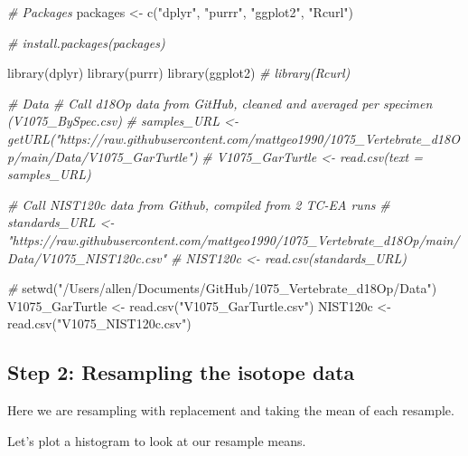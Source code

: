 \documentclass[
]{article}
\newenvironment{Shaded}{\begin{snugshade}}{\end{snugshade}}
\newcommand{\CommentTok}[1]{\textcolor[rgb]{0.56,0.35,0.01}{\textit{#1}}}
\newcommand{\FunctionTok}[1]{\textcolor[rgb]{0.00,0.00,0.00}{#1}}
\newcommand{\NormalTok}[1]{#1}
\newcommand{\OtherTok}[1]{\textcolor[rgb]{0.56,0.35,0.01}{#1}}
\newcommand{\StringTok}[1]{\textcolor[rgb]{0.31,0.60,0.02}{#1}}
\begin{document}
\begin{Shaded}
\begin{Highlighting}[]
\CommentTok{\# Packages}
\NormalTok{packages }\OtherTok{\textless{}{-}} \FunctionTok{c}\NormalTok{(}\StringTok{"dplyr"}\NormalTok{, }\StringTok{"purrr"}\NormalTok{, }\StringTok{"ggplot2"}\NormalTok{, }\StringTok{"Rcurl"}\NormalTok{)}

\CommentTok{\# install.packages(packages)}

\FunctionTok{library}\NormalTok{(dplyr)}
\FunctionTok{library}\NormalTok{(purrr)}
\FunctionTok{library}\NormalTok{(ggplot2)}
\CommentTok{\# library(Rcurl)}

\CommentTok{\# Data}
    \CommentTok{\# Call d18Op data from GitHub, cleaned and averaged per specimen (V1075\_BySpec.csv)}
      \CommentTok{\# samples\_URL \textless{}{-} getURL("https://raw.githubusercontent.com/mattgeo1990/1075\_Vertebrate\_d18Op/main/Data/V1075\_GarTurtle")}
      \CommentTok{\# V1075\_GarTurtle \textless{}{-} read.csv(text = samples\_URL)}

    \CommentTok{\# Call NIST120c data from Github, compiled from 2 TC{-}EA runs}
      \CommentTok{\# standards\_URL \textless{}{-}"https://raw.githubusercontent.com/mattgeo1990/1075\_Vertebrate\_d18Op/main/Data/V1075\_NIST120c.csv"}
        \CommentTok{\# NIST120c \textless{}{-} read.csv(standards\_URL)}

\CommentTok{\# }
\FunctionTok{setwd}\NormalTok{(}\StringTok{"/Users/allen/Documents/GitHub/1075\_Vertebrate\_d18Op/Data"}\NormalTok{)}
\NormalTok{V1075\_GarTurtle }\OtherTok{\textless{}{-}} \FunctionTok{read.csv}\NormalTok{(}\StringTok{"V1075\_GarTurtle.csv"}\NormalTok{)}
\NormalTok{NIST120c }\OtherTok{\textless{}{-}} \FunctionTok{read.csv}\NormalTok{(}\StringTok{"V1075\_NIST120c.csv"}\NormalTok{)}
\end{Highlighting}
\end{Shaded}

\hypertarget{step-2-resampling-the-isotope-data}{%
\subsection{Step 2: Resampling the isotope
data}\label{step-2-resampling-the-isotope-data}}

Here we are resampling with replacement and taking the mean of each
resample.

Let's plot a histogram to look at our resample means.
\end{document}
